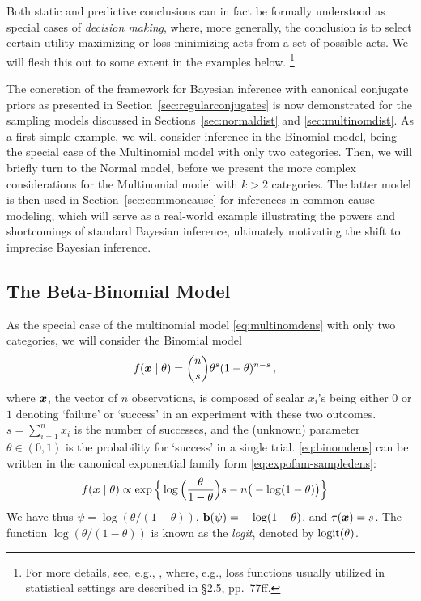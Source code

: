 Both static and predictive conclusions can in fact be formally understood as special cases of \emph{decision making},
where, more generally, the conclusion is to select certain utility maximizing or loss minimizing acts from a set of possible acts.
We will flesh this out to some extent in the examples below.%
\footnote{For more details, see, e.g., \textcite[\S 2]{2007:robert},
where, e.g., loss functions usually utilized in statistical settings are described in \S 2.5, pp.~77ff.}

The concretion of the framework for Bayesian inference with canonical conjugate priors
as presented in Section~\ref{sec:regularconjugates}
is now demonstrated for the sampling models discussed in Sections~\ref{sec:normaldist} and \ref{sec:multinomdist}.
As a first simple example, we will consider inference in the Binomial model,
being the special case of the Multinomial model with only two categories.
Then, we will briefly turn to the Normal model,
before we present the more complex considerations for the Multinomial model with $k>2$ categories.
The latter model %
is then used in Section~\ref{sec:commoncause} for inferences in common-cause modeling,
which will serve as a real-world example illustrating the powers and shortcomings of standard Bayesian inference,
ultimately motivating the shift to imprecise Bayesian inference.


\subsection{The Beta-Binomial Model}
\label{sec:beta-binom}

As the special case of the multinomial model \eqref{eq:multinomdens} with only two categories, we will consider the Binomial model
\begin{align}
\label{eq:binomdens}
f({\bm x}\mid\theta) &= {n \choose s}\theta^s (1-\theta)^{n-s}\,,
\end{align}
where ${\bm x}$, the vector of $n$ observations, is composed of scalar $x_i$'s being either $0$ or $1$
denoting `failure' or `success' in an experiment with these two outcomes.
$s = \sum_{i=1}^n x_i$ is the number of successes,
and the (unknown) parameter $\theta \in (0,1)$ is the probability for `success' in a single trial.
\eqref{eq:binomdens} can be written in the canonical exponential family form \eqref{eq:expofam-sampledens}:
\begin{align*}
f({\bm x}\mid\theta) &\propto \exp\Big\{ \log\Big(\frac{\theta}{1-\theta}\Big) s - n \big(-\log(1-\theta)\big) \Big\}
\end{align*}
We have thus $\psi = \log(\theta/(1-\theta))$, $\mathbf{b}(\psi) = -\log(1-\theta)$, and $\tau({\bm x}) = s$.
The function $\log(\theta/(1-\theta))$ is known as the \emph{logit}, denoted by $\operatorname{logit}(\theta)$.

